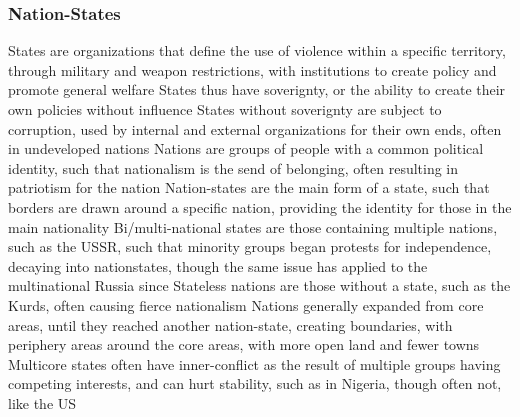 \documentclass[11 pt, twoside]{article}
\newenvironment{outline*}
{
	\begin{outline}[enumerate]
	}
	{\end{outline}
}
\begin{document}
\subsubsection{Nation-States}
\begin{outline*}
\1 States are organizations that define the use of violence within a specific territory, through military and weapon restrictions, with institutions to create policy and promote general welfare
\2 States thus have soverignty, or the ability to create their own policies without influence
\2 States without soverignty are subject to corruption, used by internal and external organizations for their own ends, often in undeveloped nations
\1 Nations are groups of people with a common political identity, such that nationalism is the send of belonging, often resulting in patriotism for the nation
\1 Nation-states are the main form of a state, such that borders are drawn around a specific nation, providing the identity for those in the main nationality
\2 Bi/multi-national states are those containing multiple nations, such as the USSR, such that minority groups began protests for independence, decaying into nationstates, though the same issue has applied to the multinational Russia since
\2 Stateless nations are those without a state, such as the Kurds, often causing fierce nationalism
\2 Nations generally expanded from core areas, until they reached another nation-state, creating boundaries, with periphery areas around the core areas, with more open land and fewer towns
\2 Multicore states often have inner-conflict as the result of multiple groups having competing interests, and can hurt stability, such as in Nigeria, though often not, like the US
\end{outline*}
\end{document}
